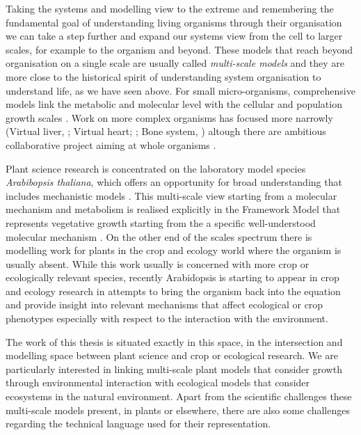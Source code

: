 \documentclass[phd]{infthesis}
\begin{document}
Taking the systems and modelling view to the extreme and remembering the
fundamental goal of understanding living organisms through their organisation we
can take a step further and expand our systems view from the cell to larger
scales, for example to the organism and beyond. These models that reach beyond
organisation on a single scale are usually called \emph{multi-scale models} and
they are more close to the historical spirit of understanding system
organisation to understand life, as we have seen above. For small
micro-organisms, comprehensive models link the metabolic and molecular level
with the cellular \citep{karr_whole-cell_2012} and population growth scales
\citep{weise_mechanistic_2015}. Work on more complex organisms has focused more
narrowly (Virtual liver, \citet{holzhutter2012virtual}; Virtual heart;
\citet{noble_modeling_2002}; Bone system, \citet{paoletti_multilevel_2012})
altough there are ambitious collaborative project aiming at whole organisms
\citep[virtual rat, virtual human][]{beard_multiscale_2012, kohl_systems_2009}.

Plant science research is concentrated on the laboratory model species
\emph{Arabibopsis thaliana}, which offers an opportunity for broad understanding
that includes mechanistic models \citep{chew_mathematical_2014,
  voss_modelling_2014}. This multi-scale view starting from a molecular
mechanism and metabolism is realised explicitly in the Framework Model that
represents vegetative growth starting from the a specific well-understood
molecular mechanism \citet[FMv1]{chew_multiscale_2014}. On the other end of the
scales spectrum there is modelling work for plants in the crop and ecology world
where the organism is usually absent. While this work usually is concerned with
more crop or ecologically relevant species, recently Arabidopsis is starting to
appear in crop and ecology research in attempts to bring the organism back into
the equation and provide insight into relevant mechanisms that affect ecological
or crop phenotypes especially with respect to the interaction with the
environment.

The work of this thesis is situated exactly in this space, in the intersection
and modelling space between plant science and crop or ecological
research. We are particularly interested in linking multi-scale plant models
that consider growth through environmental interaction with ecological models
that consider ecosystems in the natural environment.  Apart from the scientific
challenges these multi-scale models present, in plants or elsewhere, there are
also some challenges regarding the technical language used for their
representation.
\end{document}
